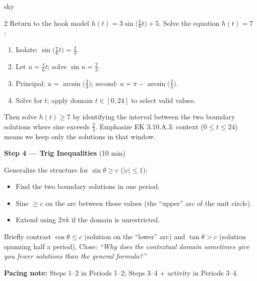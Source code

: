 \documentclass[10pt]{article}
\begin{document}
\begin{skillbox}{sky}
\begin{multicols}{2}
Return to the hook model $h(t) = 3\sin\!\bigl(\tfrac{\pi}{6}t\bigr) + 5$.
Solve the equation $h(t) = 7$:
\begin{enumerate}[leftmargin=1.2em, itemsep=1pt, topsep=2pt]
  \item Isolate: $\sin\!\bigl(\tfrac{\pi}{6}t\bigr) = \tfrac{2}{3}$.
  \item Let $u = \tfrac{\pi}{6}t$; solve $\sin u = \tfrac{2}{3}$.
  \item Principal: $u = \arcsin\!\bigl(\tfrac{2}{3}\bigr)$; second: $u = \pi - \arcsin\!\bigl(\tfrac{2}{3}\bigr)$.
  \item Solve for $t$; apply domain $t \in [0, 24]$ to select valid values.
\end{enumerate}
Then solve $h(t) \ge 7$ by identifying the interval between the two
boundary solutions where sine exceeds $\tfrac{2}{3}$. Emphasize EK 3.10.A.3:
context ($0 \le t \le 24$) means we keep only the solutions in that window.

\columnbreak

\textbf{Step 4 --- Trig Inequalities} (10 min)

Generalize the structure for $\sin\theta \ge c$ ($|c| \le 1$):
\begin{itemize}[leftmargin=1.2em, itemsep=2pt, topsep=2pt]
  \item Find the two boundary solutions in one period.
  \item Sine $\ge c$ on the arc between those values (the ``upper'' arc
    of the unit circle).
  \item Extend using $2\pi k$ if the domain is unrestricted.
\end{itemize}
Briefly contrast $\cos\theta \le c$ (solution on the ``lower'' arc) and
$\tan\theta > c$ (solution spanning half a period).
Close: \textit{``Why does the contextual domain sometimes give you fewer
solutions than the general formula?''}

\end{multicols}

\smallskip
\textbf{Pacing note:} Steps 1--2 in Periods 1--2; Steps 3--4 + activity
in Periods 3--4.
\end{skillbox}

\vspace{0.08in}
\end{document}
